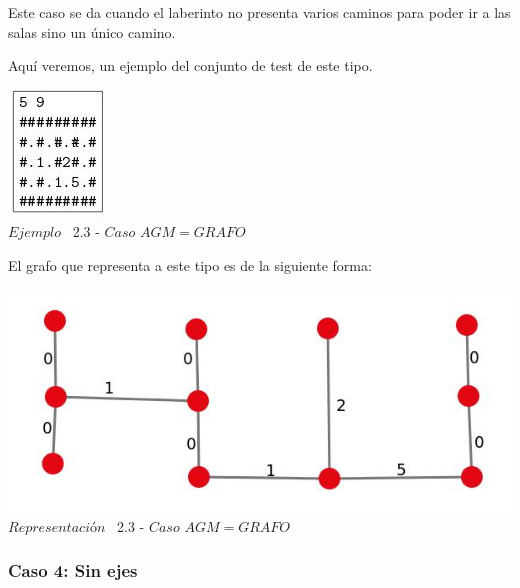 Este caso se da cuando el laberinto no presenta varios caminos para poder ir a las salas sino un \'unico camino.

Aqu\'i veremos, un ejemplo del conjunto de test de este tipo.\\
 
\vspace*{0.3cm} \vspace*{0.3cm}
  \begin{center}
 \includegraphics[scale=1.6]{./EJ2/ej2completo.jpeg}
\\ {$Ejemplo$ \ 2.3 - $Caso$ $AGM = GRAFO$}
  \end{center}
  \vspace*{0.3cm}

El grafo que representa a este tipo es de la siguiente forma:\\

\vspace*{0.3cm} \vspace*{0.3cm}
  \begin{center}
 \includegraphics[scale=0.5]{./EJ2/ej2grafocompleto.jpeg}
 \\{$Representación$ \ 2.3 - $Caso$ $AGM = GRAFO$}
  \end{center}
  \vspace*{0.3cm}

\begin{center}
 \subsubsection*{Caso 4: Sin ejes}
\end{center}


